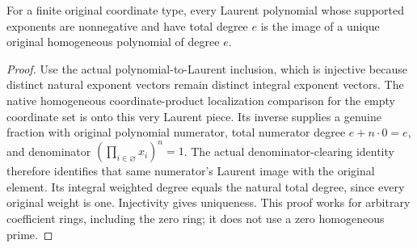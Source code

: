 \begin{lemma}
\label{lem:c0n-ambient-empty-laurent-polynomial}
\leanok
{}
For a finite original coordinate type, every Laurent polynomial whose
supported exponents are nonnegative and have total degree $e$ is the
image of a unique original homogeneous polynomial of degree $e$.
\end{lemma}
\begin{proof}
Use the actual polynomial-to-Laurent inclusion, which is injective
because distinct natural exponent vectors remain distinct integral
exponent vectors. The native homogeneous coordinate-product localization
comparison for the empty coordinate set is onto this very Laurent
piece. Its inverse supplies a genuine fraction with original polynomial
numerator, total numerator degree $e+n\cdot0=e$, and denominator
$(\prod_{i\in\varnothing}x_i)^n=1$. The actual denominator-clearing
identity therefore identifies that same numerator's Laurent image with
the original element. Its integral weighted degree equals the natural
total degree, since every original weight is one. Injectivity gives
uniqueness. This proof works for arbitrary coefficient rings, including
the zero ring; it does not use a zero homogeneous prime.
\end{proof}

